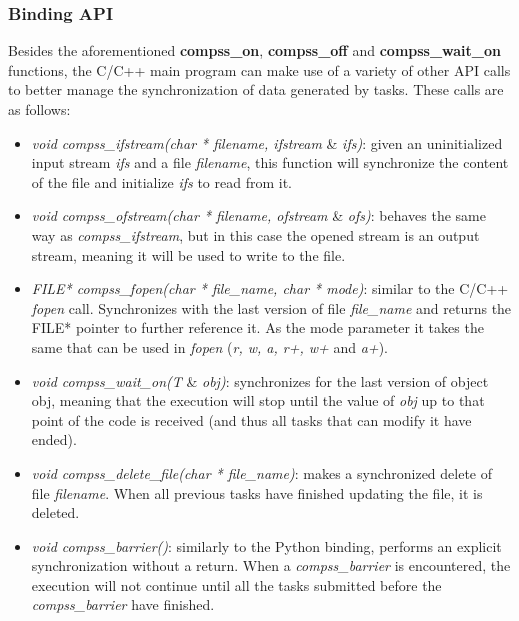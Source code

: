 \subsubsection{Binding API}
Besides the aforementioned {\bf compss\_on}, {\bf compss\_off} and {\bf compss\_wait\_on} functions, the C/C++ main program can make use of a variety of other API calls to better manage the synchronization of data generated by tasks. These calls are as follows:

\begin{itemize}
 \item {\it void compss\_ifstream(char * filename, ifstream }\& {\it ifs)}: given an uninitialized input stream {\it ifs} and a file {\it filename}, this function will synchronize the content of the file and initialize {\it ifs} to read from it.
 
 \item {\it void compss\_ofstream(char * filename, ofstream }\& {\it ofs)}: behaves the same way as {\it compss\_ifstream}, but in this case the opened stream is an output stream, meaning it will be used to write to the file.

 \item {\it FILE* compss\_fopen(char * file\_name, char * mode)}: similar to the C/C++ {\it fopen} call. Synchronizes with the last version of file {\it file\_name} and returns the FILE* pointer to further reference it. As the mode parameter it takes the same that can be used in {\it fopen} ({\it r, w, a, r+, w+} and {\it a+}). 
       
 \item {\it void compss\_wait\_on(T }\& {\it obj)}: synchronizes for the last version of object obj, meaning that the execution will stop until the value of {\it obj} up to that point of the code is received (and thus all tasks that can modify it have ended).
 
 \item {\it void compss\_delete\_file(char * file\_name)}: makes a synchronized delete of file {\it filename}. When all previous tasks have finished updating the file, it is deleted.
       
 \item {\it void compss\_barrier()}: similarly to the Python binding, performs an explicit synchronization without a return. When a {\it compss\_barrier} is encountered, the execution will not continue until all the tasks submitted before the {\it compss\_barrier} have finished.
\end{itemize}


